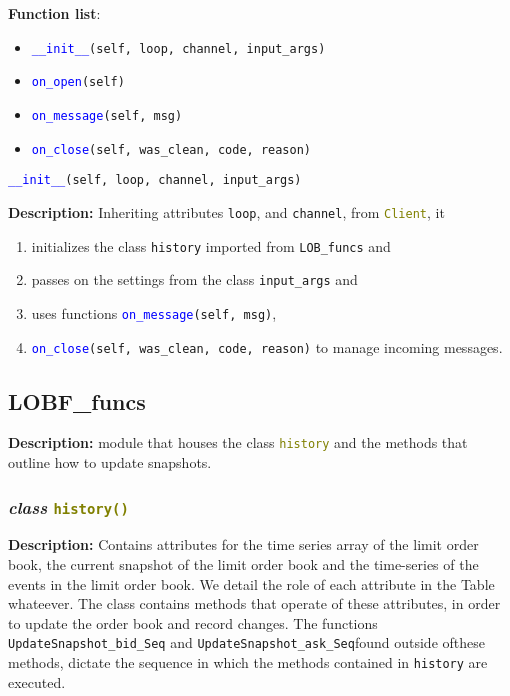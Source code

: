 \documentclass[refman]{article}
\begin{document}
	\textbf{Function list}:
	\begin{itemize}
		\item \textcolor{blue}{\texttt{\_\_init\_\_}}\texttt{(self, loop, channel, input\_args)}
		\item
		\textcolor{blue}{\texttt{on\_open}}\texttt{(self)}
		\item \textcolor{blue}{\texttt{on\_message}}\texttt{(self, msg)}
		\item \textcolor{blue}{\texttt{on\_close}}\texttt{(self, was\_clean, code, reason)}
	\end{itemize}

	\textcolor{blue}{\texttt{\_\_init\_\_}}\texttt{(self, loop, channel, input\_args)}
	\medskip
	
	\noindent \textbf{Description:} Inheriting attributes \texttt{loop}, and \texttt{channel}, from \textcolor{olive}{\texttt{Client}}, it
	\begin{enumerate} 
		\item initializes the class \texttt{history} imported from \texttt{LOB\_funcs} and
		\item passes on the settings from the class \texttt{input\_args} and \item uses functions \textcolor{blue}{\texttt{on\_message}}\texttt{(self, msg)},
		\item \textcolor{blue}{\texttt{on\_close}}\texttt{(self, was\_clean, code, reason)} to manage incoming messages.
	\end{enumerate} 



	
	
	
	 
 

\subsection{LOBF\_funcs}
\hfill \break
\textbf{Description:} module that houses the class \textcolor{olive}{\texttt{history}} and the methods that outline how to update snapshots.

\subsubsection{\textit{class} \textcolor{olive}{\texttt{history()}}}\hfill \break
\textbf{Description:} Contains attributes for the time series array of the limit order book, the current snapshot of the limit order book and the time-series of the events in the limit order book. We detail the role of each attribute in the Table whateever. The class contains methods that operate of these attributes, in order to update the order book and record changes. The functions \texttt{UpdateSnapshot\_bid\_Seq} and \texttt{UpdateSnapshot\_ask\_Seq}found outside ofthese methods, dictate the sequence in which the methods contained in \texttt{history} are executed.
\end{document}
